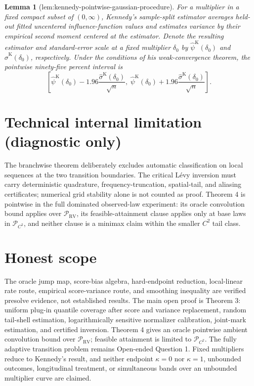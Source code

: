 \documentclass{article}
\newtheorem{lemma}{Lemma}
\begin{document}
\begin{lemma}[lem:kennedy-pointwise-gaussian-procedure]\label{lem:kennedy-pointwise-gaussian-procedure}
For a multiplier in a fixed compact subset of \((0,\infty)\), Kennedy's sample-split estimator averages held-out fitted uncentered influence-function values and estimates variance by their empirical second moment centered at the estimator.  Denote the resulting estimator and standard-error scale at a fixed multiplier \(\delta_0\) by \(\widehat\psi^{\mathrm K}(\delta_0)\) and \(\widehat\sigma^{\mathrm K}(\delta_0)\), respectively.  Under the conditions of his weak-convergence theorem, the pointwise ninety-five percent interval is
\[
\left[
\widehat\psi^{\mathrm K}(\delta_0)-1.96\frac{\widehat\sigma^{\mathrm K}(\delta_0)}{\sqrt n},\;
\widehat\psi^{\mathrm K}(\delta_0)+1.96\frac{\widehat\sigma^{\mathrm K}(\delta_0)}{\sqrt n}
\right].
\]
\end{lemma}

\section*{Technical internal limitation (diagnostic only)}

The branchwise theorem deliberately excludes automatic classification on local sequences at the two transition boundaries. The critical Lévy inversion must carry deterministic quadrature, frequency-truncation, spatial-tail, and aliasing certificates; numerical grid stability alone is not counted as proof. Theorem 4 is pointwise in the full dominated observed-law experiment: its oracle convolution bound applies over \(\mathcal P_{\mathrm{RV}}\), its feasible-attainment clause applies only at base laws in \(\mathcal P_{C^2}\), and neither clause is a minimax claim within the smaller \(C^2\) tail class.

\section{Honest scope}

The oracle jump map, score-bias algebra, hard-endpoint reduction, local-linear rate route, empirical score-variance route, and smoothing inequality are verified presolve evidence, not established results. The main open proof is Theorem 3: uniform plug-in quantile coverage after score and variance replacement, random tail-shell estimation, logarithmically sensitive normalizer calibration, joint-mark estimation, and certified inversion. Theorem 4 gives an oracle pointwise ambient convolution bound over \(\mathcal P_{\mathrm{RV}}\); feasible attainment is limited to \(\mathcal P_{C^2}\). The fully adaptive transition problem remains Open-ended Question 1. Fixed multipliers reduce to Kennedy's result, and neither endpoint \(\kappa=0\) nor \(\kappa=1\), unbounded outcomes, longitudinal treatment, or simultaneous bands over an unbounded multiplier curve are claimed.
\end{document}
